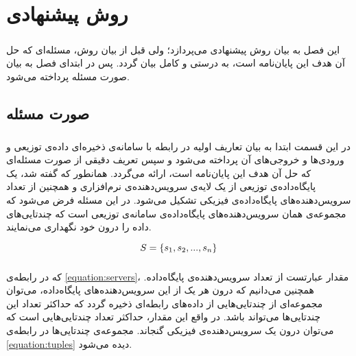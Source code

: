 
\chapter{روش پیشنهادی} \label{chapter:proposed-method}

\paragraph*{}
این فصل به بیان روش پیشنهادی می‌پردازد؛ ولی قبل از بیان روش، مسئله‌ای که حل آن هدف این پایان‌نامه است، به درستی و کامل بیان گردد. پس در ابتدای فصل به بیان صورت مسئله پرداخته می‌شود.

\section{صورت مسئله}

\paragraph*{}
در این قسمت ابتدا به بیان تعاریف اولیه در رابطه با سامانه‌ی ذخیره‌ای داده‌ی توزیعی و ورودی‌ها و خروجی‌های آن پرداخته می‌شود و سپس تعریف دقیقی از صورت مسئله‌ای که حل آن هدف این پایان‌نامه است، ارائه می‌گردد. همانطور که گفته شد، یک پایگاه‌داده‌ی توزیعی از یک لایه‌ی سرویس‌دهنده‌ی نرم‌افزاری و همچنین از تعداد سرویس‌دهنده‌های پایگاه‌داده‌ی فیزیکی تشکیل می‌شود. در این مسئله فرض می‌شود که مجموعه‌ی
\lr{$ \servers $}
همان سرویس‌دهنده‌های پایگاه‌داده‌ی سامانه‌ی توزیعی است که چندتایی‌های داده را درون خود نگهداری می‌نمایند.

\begin{latin}
	\begin{equation} \label{equation:servers}
		S = \left \{ s_{1}, s_{2}, ..., s_{n} \right \}
	\end{equation}
\end{latin}

\paragraph*{}
که در رابطه‌ی
\ref{equation:servers}،
مقدار
\lr{$ \numberOfServers $}
عبارتست از تعداد سرویس‌دهنده‌ی پایگاه‌داده. همچنین می‌دانیم که درون هر یک از این سرویس‌دهنده‌های پایگاه‌داده، می‌توان مجموعه‌ای از چند‌تایی‌هایی از داده‌های رابطه‌ای ذخیره گردد که حداکثر تعداد این چند‌تایی‌ها می‌تواند
\lr{$ \numberOfTuples $}
باشد. در واقع این مقدار، حداکثر تعداد چند‌تایی‌هایی است که می‌توان درون یک سرویس‌دهنده‌ی فیزیکی گنجاند. مجموعه‌ی چند‌تایی‌ها در رابطه‌ی
\ref{equation:tuples}
دیده می‌شود.

